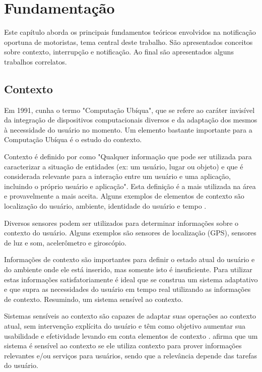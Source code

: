 
\chapter{Fundamentação}
\label{fundamentacao}
Este capítulo aborda os principais fundamentos teóricos envolvidos na notificação oportuna de motoristas,
tema central deste trabalho. São apresentados conceitos sobre contexto, interrupção e notificação.
Ao final são apresentados alguns trabalhos correlatos.

\section{Contexto}
\label{contexto}
Em 1991, \cite{weiser1991computer} cunha o termo "Computação Ubíqua", que se refere ao caráter invisível da
integração de dispositivos computacionais diversos e da adaptação dos mesmos à necessidade do usuário no momento.
Um elemento bastante importante para a Computação Ubíqua é o estudo do contexto.

Contexto é definido por \cite{dey2001understanding} como "Qualquer informação que pode ser utilizada para
caracterizar a situação de entidades (ex: um usuário, lugar ou objeto) e que é considerada relevante para
a interação entre um usuário e uma aplicação, incluindo o próprio usuário e aplicação". Esta definição é
a mais utilizada na área e provavelmente a mais aceita. Alguns exemplos de elementos de contexto são
localização do usuário, ambiente, identidade do usuário e tempo \cite{ryan1999enhanced}.

Diversos sensores podem ser utilizados para determinar informações sobre o contexto do usuário. Alguns exemplos são
sensores de localização (GPS), sensores de luz e som, acelerômetro e giroscópio.

Informações de contexto são importantes para definir o estado atual do usuário e do ambiente onde ele está inserido,
mas somente isto é insuficiente. Para utilizar estas informações satisfatoriamente é ideal que se construa um sistema
adaptativo e que supra as necessidades do usuário em tempo real utilizando as informações de contexto. Resumindo,
um sistema sensível ao contexto.

Sistemas sensíveis ao contexto são capazes de adaptar suas operações ao contexto atual, sem intervenção
explícita do usuário e têm como objetivo aumentar sua usabilidade e efetividade levando em conta elementos
de contexto \cite{baldauf2007survey}. \cite{abowd1999towards} afirma que um sistema é sensível ao contexto
se ele utiliza contexto para prover informações relevantes e/ou serviços para usuários, sendo que a relevância
depende das tarefas do usuário.

